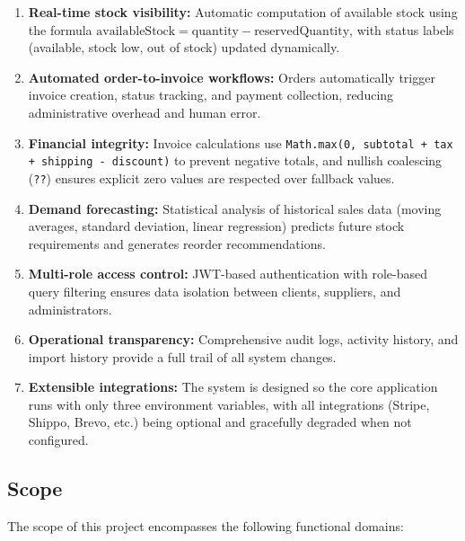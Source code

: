 \documentclass[12pt,onecolumn]{IEEEtran}
\begin{document}
\begin{enumerate}[leftmargin=1.5em]
  \item \textbf{Real-time stock visibility:} Automatic computation of available stock using the formula $\text{availableStock} = \text{quantity} - \text{reservedQuantity}$, with status labels (available, stock low, out of stock) updated dynamically.
  \item \textbf{Automated order-to-invoice workflows:} Orders automatically trigger invoice creation, status tracking, and payment collection, reducing administrative overhead and human error.
  \item \textbf{Financial integrity:} Invoice calculations use \texttt{Math.max(0, subtotal + tax + shipping - discount)} to prevent negative totals, and nullish coalescing (\texttt{??}) ensures explicit zero values are respected over fallback values.
  \item \textbf{Demand forecasting:} Statistical analysis of historical sales data (moving averages, standard deviation, linear regression) predicts future stock requirements and generates reorder recommendations.
  \item \textbf{Multi-role access control:} JWT-based authentication with role-based query filtering ensures data isolation between clients, suppliers, and administrators.
  \item \textbf{Operational transparency:} Comprehensive audit logs, activity history, and import history provide a full trail of all system changes.
  \item \textbf{Extensible integrations:} The system is designed so the core application runs with only three environment variables, with all integrations (Stripe, Shippo, Brevo, etc.) being optional and gracefully degraded when not configured.
\end{enumerate}

\subsection{Scope}

The scope of this project encompasses the following functional domains:
\end{document}
